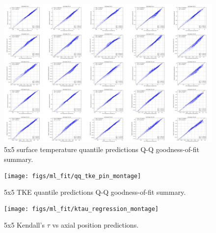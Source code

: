 \begin{landscape}
\begin{figure}[H]
    \centering
    \includegraphics[width=0.96\linewidth]{figs/ml_fit/qq_twall_montage_sm}
    \caption{5x5 surface temperature quantile predictions Q-Q goodness-of-fit summary.}
    \label{fig:qqtwallmontagesm}
\end{figure}

\begin{figure}[H]
    \centering
    \texttt{[image: figs/ml\_fit/qq\_tke\_pin\_montage]}
    \caption{5x5 TKE quantile predictions Q-Q goodness-of-fit summary.}
    \label{fig:qqtkepinmontage}
\end{figure}

\begin{figure}[H]
    \centering
    \texttt{[image: figs/ml\_fit/ktau\_regression\_montage]}
    \caption{5x5 Kendall's $\tau$ vs axial position predictions.}
    \label{fig:ktauregressionmontage}
\end{figure}
\end{landscape}
\restoregeometry

